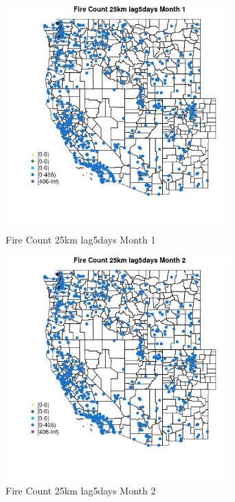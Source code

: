 \begin{figure} 
\centering  
\includegraphics[width=0.77\textwidth]{Code_Outputs/Report_ML_input_PM25_Step4_part_f_de_duplicated_aveswNAs_MapObsMo1Fire_Count_25km_lag5days.jpg} 
\caption{\label{fig:Report_ML_input_PM25_Step4_part_f_de_duplicated_aveswNAsMapObsMo1Fire_Count_25km_lag5days}Fire Count 25km lag5days Month 1} 
\end{figure} 
 

\begin{figure} 
\centering  
\includegraphics[width=0.77\textwidth]{Code_Outputs/Report_ML_input_PM25_Step4_part_f_de_duplicated_aveswNAs_MapObsMo2Fire_Count_25km_lag5days.jpg} 
\caption{\label{fig:Report_ML_input_PM25_Step4_part_f_de_duplicated_aveswNAsMapObsMo2Fire_Count_25km_lag5days}Fire Count 25km lag5days Month 2} 
\end{figure} 
 

